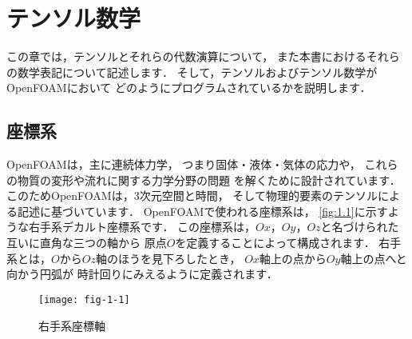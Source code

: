 \chapter{テンソル数学}
\label{chap:1}
この章では，テンソルとそれらの代数演算について，
また本書におけるそれらの数学表記について記述します．
そして，テンソルおよびテンソル数学がOpenFOAMにおいて
どのようにプログラムされているかを説明します．



\section{座標系}
\label{sec:1.1}
OpenFOAMは，主に連続体力学，
つまり固体・液体・気体の応力や，
これらの物質の変形や流れに関する力学分野の問題
を解くために設計されています．
このためOpenFOAMは，3次元空間と時間，
そして物理的要素のテンソルによる記述に基づいています．
OpenFOAMで使われる座標系は，
\autoref{fig:1.1}に示すような右手系デカルト座標系です．
この座標系は，$Ox$，$Oy$，$Oz$と名づけられた互いに直角な三つの軸から
原点$O$を定義することによって構成されます．
右手系とは，$O$から$Oz$軸のほうを見下ろしたとき，
$Ox$軸上の点から$Oy$軸上の点へと向かう円弧が
時計回りにみえるように定義されます．


\begin{figure}[ht]
 \texttt{[image: fig-1-1]}
 \caption{右手系座標軸}
 \label{fig:1.1}
\end{figure}



